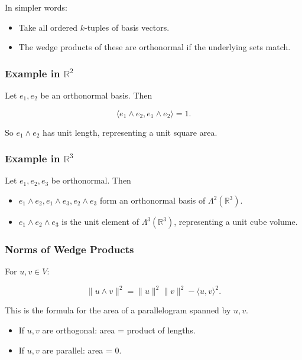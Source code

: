 \documentclass[
  letterpaper,
  DIV=11,
  numbers=noendperiod]{scrreprt}
\providecommand{\tightlist}{%
  \setlength{\itemsep}{0pt}\setlength{\parskip}{0pt}}
\begin{document}
In simpler words:

\begin{itemize}
\tightlist
\item
  Take all ordered \(k\)-tuples of basis vectors.
\item
  The wedge products of these are orthonormal if the underlying sets
  match.
\end{itemize}

\subsubsection{\texorpdfstring{Example in
\(\mathbb{R}^2\)}{Example in \textbackslash mathbb\{R\}\^{}2}}\label{example-in-mathbbr2}

Let \(e_1, e_2\) be an orthonormal basis. Then

\[
\langle e_1 \wedge e_2, e_1 \wedge e_2 \rangle = 1.
\]

So \(e_1 \wedge e_2\) has unit length, representing a unit square area.

\subsubsection{\texorpdfstring{Example in
\(\mathbb{R}^3\)}{Example in \textbackslash mathbb\{R\}\^{}3}}\label{example-in-mathbbr3}

Let \(e_1, e_2, e_3\) be orthonormal. Then

\begin{itemize}
\tightlist
\item
  \(e_1 \wedge e_2, e_1 \wedge e_3, e_2 \wedge e_3\) form an orthonormal
  basis of \(\Lambda^2(\mathbb{R}^3)\).
\item
  \(e_1 \wedge e_2 \wedge e_3\) is the unit element of
  \(\Lambda^3(\mathbb{R}^3)\), representing a unit cube volume.
\end{itemize}

\subsubsection{Norms of Wedge Products}\label{norms-of-wedge-products}

For \(u,v \in V\):

\[
\|u \wedge v\|^2 = \|u\|^2 \|v\|^2 - \langle u,v \rangle^2.
\]

This is the formula for the area of a parallelogram spanned by \(u,v\).

\begin{itemize}
\tightlist
\item
  If \(u,v\) are orthogonal: area = product of lengths.
\item
  If \(u,v\) are parallel: area = 0.
\end{itemize}
\end{document}
